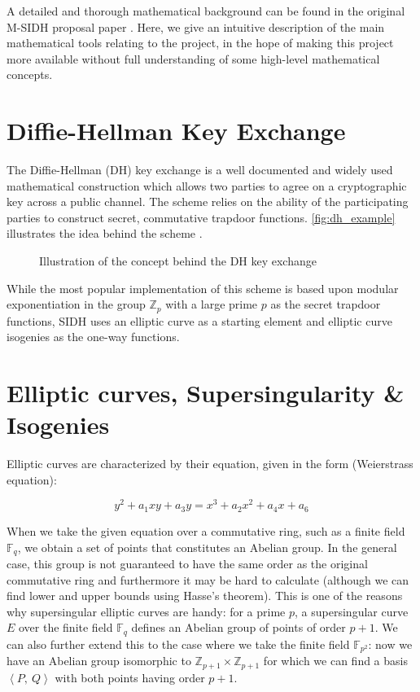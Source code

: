 \documentclass[a4paper,11pt,oneside]{report}
\newcommand{\zp}{$\mathbb{Z}_p$\xspace}
\newcommand{\Fq}{$\mathbb{F}_q$\xspace}
\begin{document}
A detailed and thorough mathematical background can be found in the original M-SIDH proposal paper \cite{msidh}. Here, we give an intuitive description of the main mathematical tools relating to the project, in the hope of making this project more available without full understanding of some high-level mathematical concepts.

\section{Diffie-Hellman Key Exchange}

    The Diffie-Hellman (DH) key exchange is a well documented and widely used mathematical construction which allows two parties to agree on a cryptographic key across a public channel. The scheme relies on the ability of the participating parties to construct secret, commutative trapdoor functions. \autoref{fig:dh_example} illustrates the idea behind the scheme \cite{dhmedia}.

    \begin{figure}[htp!]
        \centering
        
        \caption{Illustration of the concept behind the DH key exchange \cite{dhmedia}}
        \label{fig:dh_example}
    \end{figure}

    While the most popular implementation of this scheme is based upon modular exponentiation in the group \zp with a large prime $p$ as the secret trapdoor functions, SIDH uses an elliptic curve as a starting element and elliptic curve isogenies as the one-way functions. 

\section{Elliptic curves, Supersingularity \& Isogenies}

    Elliptic curves are characterized by their equation, given in the form (Weierstrass equation):

    \begin{equation}
        y^2 + a_1 x y + a_3 y = x^3 + a_2 x^2 + a_4 x + a_6
    \end{equation}

    When we take the given equation over a commutative ring, such as a finite field \Fq, we obtain a set of points that constitutes an Abelian group. In the general case, this group is not guaranteed to have the same order as the original commutative ring and furthermore it may be hard to calculate (although we can find lower and upper bounds using Hasse's theorem). This is one of the reasons why supersingular elliptic curves are handy: for a prime $p$, a supersingular curve $E$ over the finite field \Fq defines an Abelian group of points of order $p+1$. We can also further extend this to the case where we take the finite field $\mathbb{F}_{p^2}$: now we have an Abelian group isomorphic to $\mathbb{Z}_{p+1} \times \mathbb{Z}_{p+1}$ \cite{algorithms} for which we can find a basis $\left \langle P,\: Q \right \rangle$ with both points having order $p+1$.
\end{document}
